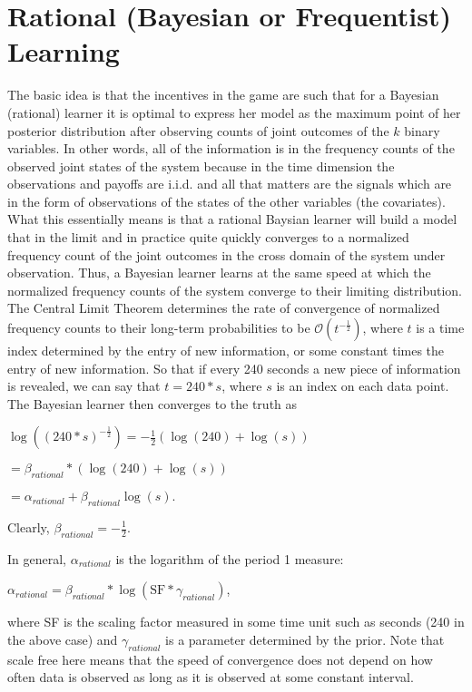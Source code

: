 \section{Rational (Bayesian or Frequentist) Learning}

The basic idea is that the incentives in the game are such that for a Bayesian (rational) learner it is optimal to express her model as the maximum point of her posterior distribution after observing counts of joint outcomes of the $k$ binary variables. In other words, all of the information is in the frequency counts of the observed joint states of the system because in the time dimension the observations and payoffs are i.i.d. and all that matters are the signals which are in the form of observations of the states of the other variables (the covariates). 
What this essentially means is that a rational Baysian learner will build a model that in the limit and in practice quite quickly converges to a normalized frequency count of the joint outcomes in the cross domain of the system under observation. Thus, a Bayesian learner learns at the same speed at which the normalized frequency counts of the system converge to their limiting distribution. The Central Limit Theorem determines the rate of convergence of normalized frequency counts to their long-term probabilities to be $\mathcal{O}( t^{-\frac{1}{2}})$, where $t$ is a time index determined by the entry of new information, or some constant times the entry of new information. So that if every 240 seconds a new piece of information is revealed, we can say that $t=240*s$, where $s$ is an index on each data point. The Bayesian learner then converges to the truth as 

$\log((240*s)^{-\frac{1}{2}}) =-\frac{1}{2}(\log(240) + \log(s))$

$= \beta_{rational} * (\log(240)+\log(s))$

$= \alpha_{rational}+\beta_{rational}\log(s).$  

Clearly, $\beta_{rational}=-\frac{1}{2}.$ 

In general, $\alpha_{rational}$ is the logarithm of the period 1 measure:

$\alpha_{rational}=\beta_{rational} * \log(\text{SF}*\gamma_{rational})$,

where SF is the scaling factor measured in some time unit such as seconds (240 in the above case) and $\gamma_{rational}$ is a parameter determined by the prior.  Note that scale free here means that the speed of convergence does not depend on how often data is observed as long as it is observed at some constant interval. 

